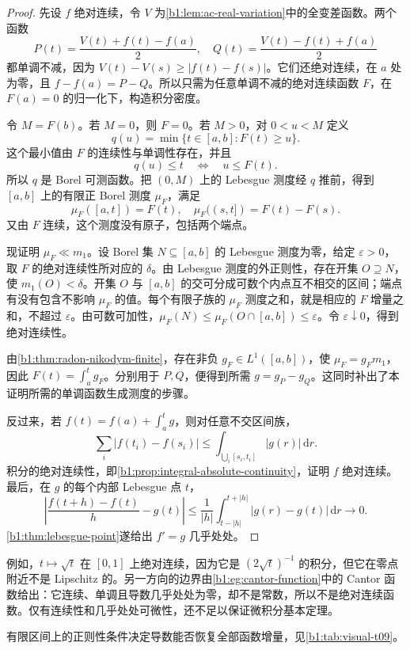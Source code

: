 \begin{proof}
先设 \(f\) 绝对连续，令 \(V\) 为\cref{b1:lem:ac-real-variation}中的全变差函数。两个函数
\[
P(t)=\frac{V(t)+f(t)-f(a)}2,
\quad
Q(t)=\frac{V(t)-f(t)+f(a)}2
\]
都单调不减，因为 \(V(t)-V(s)\geq|f(t)-f(s)|\)。它们还绝对连续，在 \(a\) 处为零，且 \(f-f(a)=P-Q\)。所以只需为任意单调不减的绝对连续函数 \(F\)，在 \(F(a)=0\) 的归一化下，构造积分密度。

令 \(M=F(b)\)。若 \(M=0\)，则 \(F=0\)。若 \(M>0\)，对 \(0<u<M\) 定义
\[
q(u)=\min\{t\in[a,b]:F(t)\geq u\}.
\]
这个最小值由 \(F\) 的连续性与单调性存在，并且
\[
q(u)\leq t\quad\Longleftrightarrow\quad u\leq F(t).
\]
所以 \(q\) 是 Borel 可测函数。把 \((0,M)\) 上的 Lebesgue 测度经 \(q\) 推前，得到 \([a,b]\) 上的有限正 Borel 测度 \(\mu_F\)，满足
\[
\mu_F([a,t])=F(t),
\quad
\mu_F((s,t])=F(t)-F(s).
\]
又由 \(F\) 连续，这个测度没有原子，包括两个端点。

现证明 \(\mu_F\ll m_1\)。设 Borel 集 \(N\subseteq[a,b]\) 的 Lebesgue 测度为零，给定 \(\varepsilon>0\)，取 \(F\) 的绝对连续性所对应的 \(\delta\)。由 Lebesgue 测度的外正则性，存在开集 \(O\supseteq N\)，使 \(m_1(O)<\delta\)。开集 \(O\) 与 \([a,b]\) 的交可分成可数个内点互不相交的区间；端点有没有包含不影响 \(\mu_F\) 的值。每个有限子族的 \(\mu_F\) 测度之和，就是相应的 \(F\) 增量之和，不超过 \(\varepsilon\)。由可数可加性，\(\mu_F(N)\leq\mu_F(O\cap[a,b])\leq\varepsilon\)。令 \(\varepsilon\downarrow0\)，得到绝对连续性。

由\cref{b1:thm:radon-nikodym-finite}，存在非负 \(g_F\in L^1([a,b])\)，使 \(\mu_F=g_Fm_1\)，因此 \(F(t)=\int_a^t g_F\)。分别用于 \(P,Q\)，便得到所需 \(g=g_P-g_Q\)。这同时补出了本证明所需的单调函数生成测度的步骤。

反过来，若 \(f(t)=f(a)+\int_a^t g\)，则对任意不交区间族，
\[
\sum_i|f(t_i)-f(s_i)|
\leq\int_{\bigcup_i[s_i,t_i]}|g(r)|\,\mathrm dr.
\]
积分的绝对连续性，即\cref{b1:prop:integral-absolute-continuity}，证明 \(f\) 绝对连续。最后，在 \(g\) 的每个内部 Lebesgue 点 \(t\)，
\[
\left|\frac{f(t+h)-f(t)}h-g(t)\right|
\leq\frac1{|h|}\int_{t-|h|}^{t+|h|}|g(r)-g(t)|\,\mathrm dr
\longrightarrow0.
\]
\cref{b1:thm:lebesgue-point}遂给出 \(f'=g\) 几乎处处。
\end{proof}

例如，\(t\mapsto\sqrt t\) 在 \([0,1]\) 上绝对连续，因为它是 \((2\sqrt t)^{-1}\) 的积分，但它在零点附近不是 Lipschitz 的。另一方向的边界由\cref{b1:eg:cantor-function}中的 Cantor 函数给出：它连续、单调且导数几乎处处为零，却不是常数，所以不是绝对连续函数。仅有连续性和几乎处处可微性，还不足以保证微积分基本定理。

有限区间上的正则性条件决定导数能否恢复全部函数增量，见\cref{b1:tab:visual-t09}。

